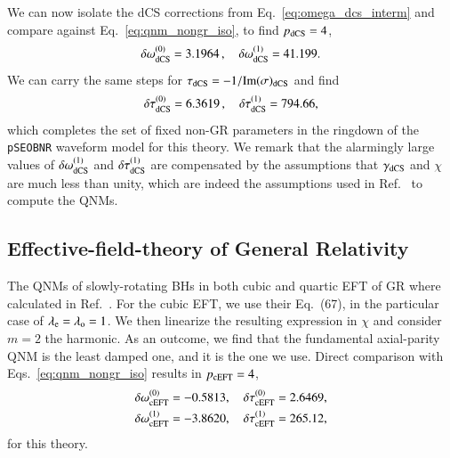 \documentclass[twocolumn,
               prd,
               aps,
               superscriptaddress,
               tightenlines,
               nofootinbib,
               eqsecnum,
               amsfonts,
               amsmath,
               longbibliography]{revtex4-1}
\newcommand{\pSEOB}{\texttt{pSEOBNR}}
\newcommand{\lame}{\lambda_{\rm e}}
\newcommand{\lamo}{\lambda_{\rm o}}
\begin{document}
We can now isolate the dCS corrections from Eq.~\eqref{eq:omega_dcs_interm} and
compare against Eq.~\eqref{eq:qnm_nongr_iso}, to find
$p_{\rm dCS} = 4$,
%
\begin{equation}
\delta \omega^{(0)}_{\rm dCS} = 3.1964\,, \quad \delta \omega^{(1)}_{\rm dCS} = 41.199.
\label{eq:cs_omega_coefs}
\end{equation}
%
We can carry the same steps for $\tau_{\rm dCS} = - 1 / {\rm Im}(\sigma)_{\rm dCS}$ and find
%
\begin{equation}
\delta \tau^{(0)}_{\rm dCS} = 6.3619\,, \quad \delta \tau^{(1)}_{\rm dCS} = 794.66,
\label{eq:cs_tau_coefs}
\end{equation}
%
which completes the set of fixed non-GR parameters in the ringdown of the \pSEOB{}
waveform model for this theory.
%
We remark that the alarmingly large values of
$\delta \omega_{\rm dCS}^{(1)}$ and $\delta \tau_{\rm dCS}^{(1)}$ are
compensated by the assumptions that $\gamma_{\rm dCS}$ and $\chi$
are much less than unity, which are indeed the assumptions used in Ref.~\cite{Wagle:2021tam}
to compute the QNMs.

\subsection{Effective-field-theory of General Relativity}
\label{app:map_eftofgr}

The QNMs of slowly-rotating BHs in both cubic and quartic EFT of GR where calculated in Ref.~\cite{Cano:2021myl}.
%
For the cubic EFT, we use their Eq.~(67), in the particular case of $\lame = \lamo = 1$.
%
%
We then linearize the resulting expression in $\chi$ and consider $m=2$ the harmonic.
%
As an outcome, we find that the fundamental axial-parity QNM is the least damped one, and it is
the one we use.
%
Direct comparison with Eqs.~\eqref{eq:qnm_nongr_iso} results in $p_{\rm cEFT} = 4$,
%
\begin{align}
    \delta \omega_{\rm cEFT}^{(0)} = - 0.5813, \quad \delta \tau_{\rm cEFT}^{(0)} = 2.6469,
    \nonumber \\
    \delta \omega_{\rm cEFT}^{(1)} = -3.8620, \quad \delta \tau_{\rm cEFT}^{(1)} = 265.12,
\end{align}
%
for this theory.
\end{document}
